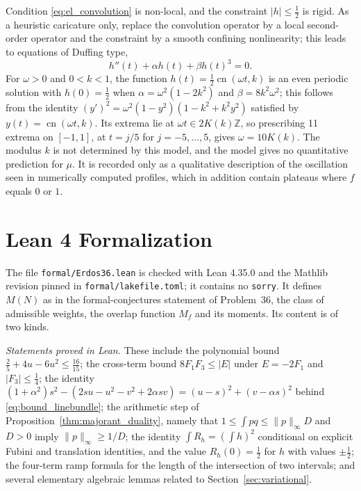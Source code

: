 \documentclass[11pt,a4paper]{article}
\theoremstyle{definition}
\theoremstyle{remark}
\newcommand{\Z}{\mathbb{Z}}
\begin{document}
Condition \eqref{eq:el_convolution} is non-local, and the constraint $|h| \le \frac{1}{2}$ is rigid. As a heuristic caricature only, replace the convolution operator by a local second-order operator and the constraint by a smooth confining nonlinearity; this leads to equations of Duffing type,
\begin{equation}
h''(t) + \alpha h(t) + \beta h(t)^3 = 0.
\end{equation}
For $\omega > 0$ and $0 < k < 1$, the function $h(t) = \frac{1}{2} \operatorname{cn}(\omega t, k)$ is an even periodic solution with $h(0) = \frac{1}{2}$ when $\alpha = \omega^2(1 - 2k^2)$ and $\beta = 8 k^2 \omega^2$; this follows from the identity $(y')^2 = \omega^2 (1 - y^2)(1 - k^2 + k^2 y^2)$ satisfied by $y(t) = \operatorname{cn}(\omega t, k)$. Its extrema lie at $\omega t \in 2K(k)\Z$, so prescribing 11 extrema on $[-1, 1]$, at $t = j/5$ for $j = -5, \dots, 5$, gives $\omega = 10 K(k)$. The modulus $k$ is not determined by this model, and the model gives no quantitative prediction for $\mu$. It is recorded only as a qualitative description of the oscillation seen in numerically computed profiles, which in addition contain plateaus where $f$ equals $0$ or $1$.

\section{Lean 4 Formalization}
\label{sec:lean}

The file \nolinkurl{formal/Erdos36.lean} is checked with Lean 4.35.0 and the Mathlib revision pinned in \nolinkurl{formal/lakefile.toml}; it contains no \texttt{sorry}. It defines $M(N)$ as in the formal-conjectures statement of Problem~36, the class of admissible weights, the overlap function $M_f$ and its moments. Its content is of two kinds.

\emph{Statements proved in Lean.} These include the polynomial bound $\frac{2}{5} + 4u - 6u^2 \le \frac{16}{15}$; the cross-term bound $8F_1F_3 \le |E|$ under $E = -2F_1$ and $|F_3| \le \frac{1}{4}$; the identity $(1+\alpha^2)s^2 - (2su - u^2 - v^2 + 2\alpha s v) = (u-s)^2 + (v-\alpha s)^2$ behind \eqref{eq:bound_linebundle}; the arithmetic step of Proposition~\ref{thm:majorant_duality}, namely that $1 \le \int pq \le \|p\|_\infty D$ and $D > 0$ imply $\|p\|_\infty \ge 1/D$; the identity $\int R_h = (\int h)^2$ conditional on explicit Fubini and translation identities, and the value $R_h(0) = \frac{1}{2}$ for $h$ with values $\pm\frac{1}{2}$; the four-term ramp formula for the length of the intersection of two intervals; and several elementary algebraic lemmas related to Section~\ref{sec:variational}.
\end{document}
